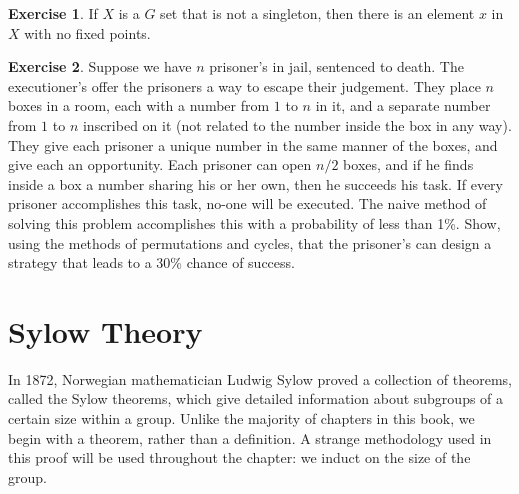 \documentclass[12pt]{amsbook}
\theoremstyle{definition}
\newtheorem{exercise}{Exercise}[chapter]
\begin{document}
\begin{exercise}
    If $X$ is a $G$ set that is not a singleton, then there is an element $x$ in $X$ with no fixed points.
\end{exercise}

\begin{exercise}
    Suppose we have $n$ prisoner's in jail, sentenced to death. The executioner's offer the prisoners a way to escape their judgement. They place $n$ boxes in a room, each with a number from $1$ to $n$ in it, and a separate number from $1$ to $n$ inscribed on it (not related to the number inside the box in any way). They give each prisoner a unique number in the same manner of the boxes, and give each an opportunity. Each prisoner can open $n/2$ boxes, and if he finds inside a box a number sharing his or her own, then he succeeds his task. If every prisoner accomplishes this task, no-one will be executed. The naive method of solving this problem accomplishes this with a probability of less than 1\%. Show, using the methods of permutations and cycles, that the prisoner's can design a strategy that leads to a 30\% chance of success.
\end{exercise}





\chapter{Sylow Theory}

In 1872, Norwegian mathematician Ludwig Sylow proved a collection of theorems, called the Sylow theorems, which give detailed information about subgroups of a certain size within a group. Unlike the majority of chapters in this book, we begin with a theorem, rather than a definition. A strange methodology used in this proof will be used throughout the chapter: we induct on the size of the group.
\end{document}
